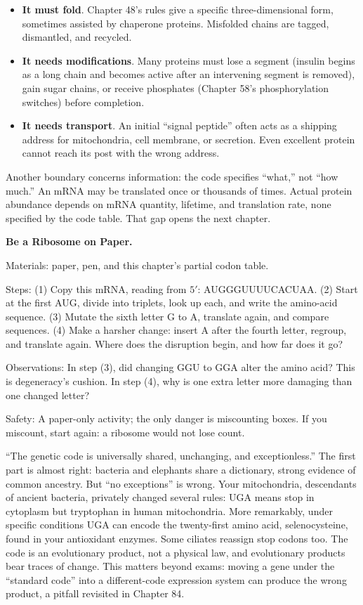 \begin{itemize}[itemsep=2pt]
\item \textbf{It must fold}. Chapter 48's rules give a specific three-dimensional form, sometimes assisted by chaperone proteins. Misfolded chains are tagged, dismantled, and recycled.
\item \textbf{It needs modifications}. Many proteins must lose a segment (insulin begins as a long chain and becomes active after an intervening segment is removed), gain sugar chains, or receive phosphates (Chapter 58's phosphorylation switches) before completion.
\item \textbf{It needs transport}. An initial ``signal peptide'' often acts as a shipping address for mitochondria, cell membrane, or secretion. Even excellent protein cannot reach its post with the wrong address.
\end{itemize}

Another boundary concerns information: the code specifies ``what,'' not ``how much.'' An mRNA may be translated once or thousands of times. Actual protein abundance depends on mRNA quantity, lifetime, and translation rate, none specified by the code table. That gap opens the next chapter.

\begin{shiyan}
\textbf{Be a Ribosome on Paper.}

Materials: paper, pen, and this chapter's partial codon table.

Steps: (1) Copy this mRNA, reading from $5'$: AUGGGUUUUCACUAA. (2) Start at the first AUG, divide into triplets, look up each, and write the amino-acid sequence. (3) Mutate the sixth letter G to A, translate again, and compare sequences. (4) Make a harsher change: insert A after the fourth letter, regroup, and translate again. Where does the disruption begin, and how far does it go?

Observations: In step (3), did changing GGU to GGA alter the amino acid? This is degeneracy's cushion. In step (4), why is one extra letter more damaging than one changed letter?

Safety: A paper-only activity; the only danger is miscounting boxes. If you miscount, start again: a ribosome would not lose count.
\end{shiyan}

\begin{wuqu}
``The genetic code is universally shared, unchanging, and exceptionless.'' The first part is almost right: bacteria and elephants share a dictionary, strong evidence of common ancestry. But ``no exceptions'' is wrong. Your mitochondria, descendants of ancient bacteria, privately changed several rules: UGA means stop in cytoplasm but tryptophan in human mitochondria. More remarkably, under specific conditions UGA can encode the twenty-first amino acid, selenocysteine, found in your antioxidant enzymes. Some ciliates reassign stop codons too. The code is an evolutionary product, not a physical law, and evolutionary products bear traces of change. This matters beyond exams: moving a gene under the ``standard code'' into a different-code expression system can produce the wrong product, a pitfall revisited in Chapter 84.
\end{wuqu}

